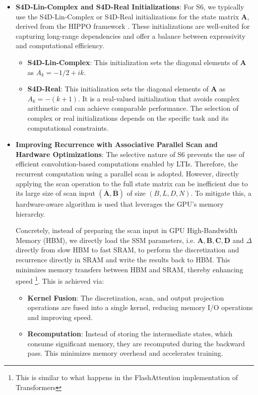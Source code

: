 \documentclass[12pt,a4paper]{report}
\begin{document}
\begin{itemize}
    \item \textbf{S4D-Lin-Complex and S4D-Real Initializations}: For S6, we typically use the S4D-Lin-Complex or S4D-Real initializations for the state matrix $\mathbf{A}$, derived from the HIPPO framework \cite{hippo}. These initializations are well-suited for capturing long-range dependencies and offer a balance between expressivity and computational efficiency.
    \begin{itemize}
        \item \textbf{S4D-Lin-Complex}: This initialization sets the diagonal elements of $\mathbf{A}$ as $A_k = -1/2 + i k$.
        \item \textbf{S4D-Real}: This initialization sets the diagonal elements of $\mathbf{A}$ as $A_k = -(k+1)$. It is a real-valued initialization that avoids complex arithmetic and can achieve comparable performance. The selection of complex or real initializations depends on the specific task and its computational constraints.
    \end{itemize}
    \item \textbf{Improving Recurrence with Associative Parallel Scan and Hardware Optimizations}: The selective nature of S6 prevents the use of efficient convolution-based computations enabled by LTIs. Therefore, the recurrent computation using a parallel scan \cite{mamba} is adopted. However, directly applying the scan operation to the full state matrix can be inefficient due to its large size of scan input $(\overline{\mathbf{A}}, \overline{\mathbf{B}})$ of size $(B, L, D, N)$. To mitigate this, a hardware-aware algorithm is used that leverages the GPU's memory hierarchy. 
    
    Concretely, instead of preparing the scan input in GPU High-Bandwidth Memory (HBM), we directly load the SSM parameters, i.e. $\mathbf{A}, \mathbf{B}, \mathbf{C}, \mathbf{D}$ and $\Delta$ directly from slow HBM to fast SRAM, to perform the discretization and recurrence directly in SRAM and write the results back to HBM. This minimizes memory transfers between HBM and SRAM, thereby enhancing speed \footnote{This is similar to what happens in the FlashAttention \cite{flashattn} implementation of Transformers}. This is achieved via:
    \begin{itemize}
        \item \textbf{Kernel Fusion}: The discretization, scan, and output projection operations are fused into a single kernel, reducing memory I/O operations and improving speed.
        \item \textbf{Recomputation}: Instead of storing the intermediate states, which consume significant memory, they are recomputed during the backward pass. This minimizes memory overhead and accelerates training.
    \end{itemize}
\end{itemize}
\end{document}
